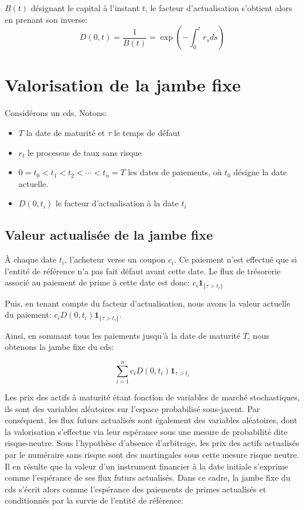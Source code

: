 $B(t)$ désignant le capital à l'instant $t$, le facteur d'actualisation s'obtient alors en prenant son inverse:
\begin{equation}
    D(0, t) = \frac{1}{B(t)} = \exp(-\int_0^t r_s ds)
    \label{eq:facteur_actualisation}
\end{equation}


\section{Valorisation de la jambe fixe}

Considérons un \gls{cds}.
Notons:
\begin{itemize}
    \item $T$ la date de maturité et $\tau$ le temps de défaut
    \item $r_t$ le processus de taux sans risque
    \item $0 = t_0 < t_1 < t_2 < \cdots < t_n = T$ les dates de paiements, où $t_0$ désigne la date actuelle.
    \item $D(0, t_i)$ le facteur d'actualisation à la date $t_i$
\end{itemize}

\subsection{Valeur actualisée de la jambe fixe}

À chaque date $t_i$, l'acheteur verse un coupon $c_i$. Ce paiement n'est effectué que si l'entité de référence n'a pas fait défaut avant cette date. Le flux de trésorerie associé au paiement de prime à cette date est donc: $c_i \mathbf{1}_{\{\tau > t_i\}}$

Puis, en tenant compte du facteur d'actualisation, nous avons la valeur actuelle du paiement: $c_i D(0, t_i) \mathbf{1}_{\{\tau > t_i\}}$.

Ainsi, en sommant tous les paiements jusqu'à la date de maturité $T$, nous obtenons la jambe fixe du \gls{cds}:

$$\sum_{i = 1}^n c_i D(0, t_i) \mathbf{1}_{\tau > t_i}$$

Les prix des actifs à maturité étant fonction de variables de marché stochastiques, ils sont des variables aléatoires sur l’espace probabilisé sous-jacent. Par conséquent, les flux futurs actualisés sont également des variables aléatoires, dont la valorisation s’effectue via leur espérance sous une mesure de probabilité dite risque-neutre. Sous l’hypothèse d’absence d’arbitrage, les prix des actifs actualisés par le numéraire sans risque sont des martingales sous cette mesure risque neutre. Il en résulte que la valeur d’un instrument financier à la date initiale s’exprime comme l’espérance de ses flux futurs actualisés. Dans ce cadre, la jambe fixe du \gls{cds} s’écrit alors comme l’espérance des paiements de primes actualisés et conditionnés par la survie de l’entité de référence:

